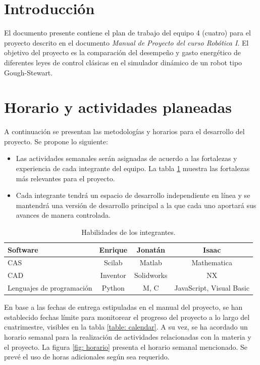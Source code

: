 \section{Introducción}

El documento presente contiene el plan de trabajo del 
equipo 4 (cuatro) para el proyecto descrito en el documento 
\emph{Manual de Proyecto del curso Robótica I}.  El 
objetivo del 
proyecto es la comparación del desempeño y gasto energético 
de diferentes leyes de control clásicas en el simulador 
din\'amico de un robot tipo Gough-Stewart. 


\section{Horario y actividades planeadas}

A continuación se presentan las metodologías y horarios 
para el desarrollo del proyecto. Se propone lo siguiente:

\begin{itemize} 

\item Las actividades semanales ser\'an asignadas de 
acuerdo a las fortalezas y experiencia de cada integrante 
del equipo. La tabla \ref{table: habilidades} muestra las 
fortalezas m\'as relevantes para el proyecto. 

\item Cada integrante tendrá un espacio de desarrollo  
independiente en línea y se mantendrá una versión de 
desarrollo principal a la que cada uno aportará sus avances 
de manera controlada.


\end{itemize}
 
% 
\begin{table} 
\centering \begin{tabular}{p{3cm}|c|c|c} 
Software & Enrique & Jonatán & Isaac\\ 
\hline 
CAS  & Scilab & Matlab & Mathematica\\ 
CAD & Inventor & Solidworks  & NX\\ 
Lenguajes de programación & Python & M, C & JavaScript, 
Visual Basic\\ 
\hline
\end{tabular} 
\caption{Habilidades de los integrantes.} 
\label{table: habilidades} 
\end{table}

En base a las fechas de entrega estipuladas en el manual 
del proyecto, se han establecido fechas l\'imite para 
monitorear el progreso del proyecto a lo largo del 
cuatrimestre, visibles en la tabla \ref{table: calendar}. A 
su vez, se ha acordado un horario semanal para la 
realizaci\'on de actividades relacionadas con la materia y 
el proyecto. La figura \ref{fig: horario} presenta el 
horario semanal mencionado. Se prev\'e el uso de horas 
adicionales seg\'un sea requerido.



